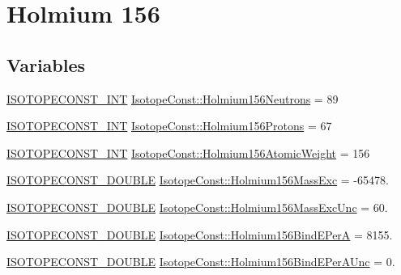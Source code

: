\hypertarget{group___isotope_const-_holmium-_ho156}{}\section{Holmium 156}
\label{group___isotope_const-_holmium-_ho156}
\subsection*{Variables}
\begin{DoxyCompactItemize}
\item 
\mbox{\hyperlink{group___isotope_const-_macros_ga5f18360b3e99483a35c32d789e62621c}{I\+S\+O\+T\+O\+P\+E\+C\+O\+N\+S\+T\+\_\+\+I\+NT}} \mbox{\hyperlink{group___isotope_const-_holmium-_ho156_ga7244b61d7ac2d6b085ddc937ec006704}{Isotope\+Const\+::\+Holmium156\+Neutrons}} = 89
\item 
\mbox{\hyperlink{group___isotope_const-_macros_ga5f18360b3e99483a35c32d789e62621c}{I\+S\+O\+T\+O\+P\+E\+C\+O\+N\+S\+T\+\_\+\+I\+NT}} \mbox{\hyperlink{group___isotope_const-_holmium-_ho156_ga486e6953ce25848d51a2db166c0c9360}{Isotope\+Const\+::\+Holmium156\+Protons}} = 67
\item 
\mbox{\hyperlink{group___isotope_const-_macros_ga5f18360b3e99483a35c32d789e62621c}{I\+S\+O\+T\+O\+P\+E\+C\+O\+N\+S\+T\+\_\+\+I\+NT}} \mbox{\hyperlink{group___isotope_const-_holmium-_ho156_ga0fe7994f01891af7884d303ec686da6c}{Isotope\+Const\+::\+Holmium156\+Atomic\+Weight}} = 156
\item 
\mbox{\hyperlink{group___isotope_const-_macros_ga8f45a7272ce02c0b4c65c44636ed719a}{I\+S\+O\+T\+O\+P\+E\+C\+O\+N\+S\+T\+\_\+\+D\+O\+U\+B\+LE}} \mbox{\hyperlink{group___isotope_const-_holmium-_ho156_ga65f75147359de9b9c20bf4912d49dd03}{Isotope\+Const\+::\+Holmium156\+Mass\+Exc}} = -\/65478.
\item 
\mbox{\hyperlink{group___isotope_const-_macros_ga8f45a7272ce02c0b4c65c44636ed719a}{I\+S\+O\+T\+O\+P\+E\+C\+O\+N\+S\+T\+\_\+\+D\+O\+U\+B\+LE}} \mbox{\hyperlink{group___isotope_const-_holmium-_ho156_ga4df80ed958172970ec3fc504bd7b75a1}{Isotope\+Const\+::\+Holmium156\+Mass\+Exc\+Unc}} = 60.
\item 
\mbox{\hyperlink{group___isotope_const-_macros_ga8f45a7272ce02c0b4c65c44636ed719a}{I\+S\+O\+T\+O\+P\+E\+C\+O\+N\+S\+T\+\_\+\+D\+O\+U\+B\+LE}} \mbox{\hyperlink{group___isotope_const-_holmium-_ho156_ga2430299c5329954a0601647bbe2d06b2}{Isotope\+Const\+::\+Holmium156\+Bind\+E\+PerA}} = 8155.
\item 
\mbox{\hyperlink{group___isotope_const-_macros_ga8f45a7272ce02c0b4c65c44636ed719a}{I\+S\+O\+T\+O\+P\+E\+C\+O\+N\+S\+T\+\_\+\+D\+O\+U\+B\+LE}} \mbox{\hyperlink{group___isotope_const-_holmium-_ho156_ga30619848d65b0c6e4573cf18d7265ce6}{Isotope\+Const\+::\+Holmium156\+Bind\+E\+Per\+A\+Unc}} = 0.

\end{DoxyCompactItemize}
